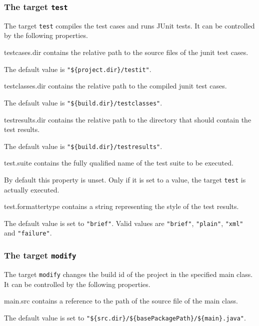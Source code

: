 \documentclass[a4paper,twoside,11pt,bibtotoc]{article}
\begin{document}
\subsubsection{The target \texttt{test}}
The target \texttt{test} compiles the test cases and runs JUnit tests.
It can be controlled by the following properties.
\begin{description*}
	\item[testcases.dir] contains the relative path to the source files of the junit test cases.\par The default value is \texttt{"\$\{project.dir\}/testit"}.
	\item[testclasses.dir] contains the relative path to the compiled junit test cases.\par The default value is \texttt{"\$\{build.dir\}/testclasses"}.
	\item[testresults.dir] contains the relative path to the directory that should contain the test results.\par The default value is \texttt{"\$\{build.dir\}/testresults"}.
	\item[test.suite] contains the fully qualified name of the test suite to be executed.\par By default this property is unset. Only if it is set to a value, the target \texttt{test} is actually executed.
	\item[test.formattertype] contains a string representing the style of the test results.\par The default value is set to \texttt{"brief"}. Valid values are \texttt{"brief"}, \texttt{"plain"}, \texttt{"xml"} and \texttt{"failure"}.
\end{description*}

\subsubsection{The target \texttt{modify}}
The target \texttt{modify} changes the build id of the project in the specified main class.
It can be controlled by the following properties.

\begin{description*}
	\item[main.src] contains a reference to the path of the source file of the main class.\par The default value is set to \texttt{"\$\{src.dir\}/\$\{basePackagePath\}/\$\{main\}.java"}.
\end{description*}
\end{document}
